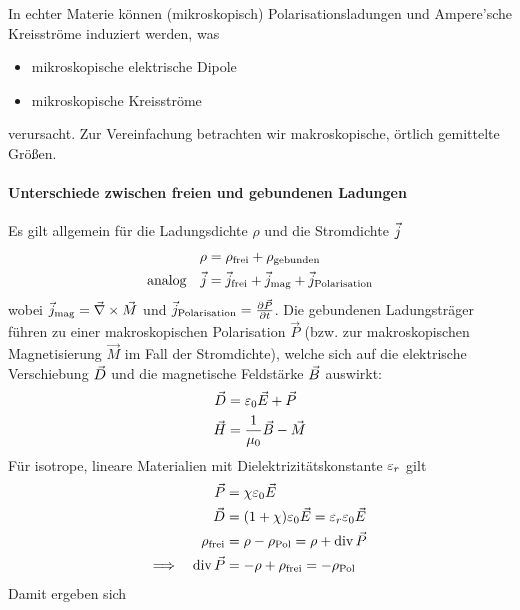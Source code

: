  In echter Materie können (mikroskopisch)
Polarisationsladungen und Ampere'sche Kreisströme induziert werden, was
\begin{itemize}
	\item mikroskopische elektrische Dipole
	\item mikroskopische Kreisströme
\end{itemize}
verursacht. Zur Vereinfachung betrachten wir makroskopische, örtlich
gemittelte Größen.

\paragraph{Unterschiede zwischen freien und gebundenen Ladungen}
Es gilt allgemein für die Ladungsdichte $\rho$%
 und die
Stromdichte $\vecj$%
\begin{align*}
  \rho&=\rho_\text{frei}+\rho_\text{gebunden}\\
  \text{analog}\quad
  \vecj&=\vecj_\text{frei} + \vecj_\text{mag} + \vecj_\text{Polarisation}
\end{align*}
wobei   
$\vecj_\text{mag} = \vecna\times\vec{M}$ und 
$\vecj_\text{Polarisation}=\dif[\vec{P}]{t}$.
Die gebundenen Ladungsträger führen zu einer makroskopischen
Polarisation $\vec{P}$%
(bzw. zur makroskopischen Magnetisierung $\vec{M}$%
 im Fall der Stromdichte), welche sich auf die elektrische
 Verschiebung $\vecD$ und die magnetische Feldstärke $\vecB$ auswirkt:
\begin{align*}
	\vecD&=\epso\vecE+\vecP\\
	\vecH&=\frac{1}{\muo}\vecB-\vecM
\end{align*}%
Für isotrope, lineare Materialien mit Dielektrizitätskonstante
$\eps_r$ gilt
\begin{align*}
	\vecP&= \chi \epso\vecE\\
	\vecD&= (1+\chi)\epso\vecE=\eps_r\epso\vecE\\
	\rho_\text{frei}
         &= \rho-\rho_\text{Pol}
           = \rho+\Div\vecP\\
	\Longrightarrow \quad
  \Div\vecP&= -\rho + \rho_\text{frei} = -\rho_\text{Pol}
\end{align*}%
%
Damit ergeben sich
